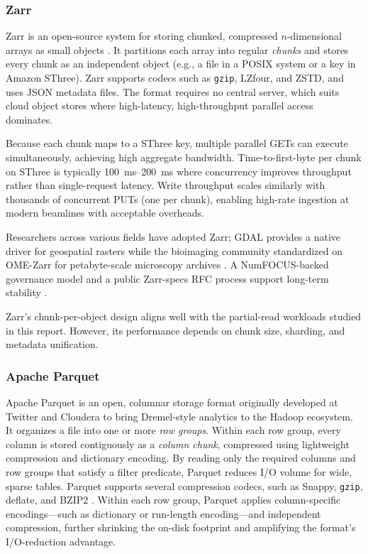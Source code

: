 \documentclass[nomenclature, english, bibtex]{kththesis}
\numberwithin{listing}{chapter}
\begin{document}
\subsubsection{Zarr}
\label{sec:zarr}
Zarr is an open-source system for storing chunked, compressed $n$-dimensional arrays as small objects \cite{zarrspecv3}. It partitions each array into regular \emph{chunks} and stores every chunk as an independent object (e.g., a file in a \gls{POSIX} system or a key in Amazon \gls{SThree}). Zarr supports codecs such as \texttt{gzip}, \gls{LZfour}, and \gls{ZSTD}, and uses \gls{JSON} metadata files. The format requires no central server, which suits cloud object stores where high-latency, high-throughput parallel access dominates.

Because each chunk maps to a \gls{SThree} key, multiple parallel GETs can execute simultaneously, achieving high aggregate bandwidth. Time-to-first-byte per chunk on \gls{SThree} is typically \SIrange{100}{200}{\milli\second} where concurrency improves throughput rather than single-request latency. Write throughput scales similarly with thousands of concurrent PUTs (one per chunk), enabling high-rate ingestion at modern beamlines with acceptable overheads.

Researchers across various fields have adopted Zarr; \gls{GDAL} provides a native driver for geospatial rasters \cite{gdal2024zarr} while the bioimaging community standardized on \gls{OME}-Zarr for petabyte-scale microscopy archives \cite{moore2023ome}. A NumFOCUS-backed governance model and a public Zarr-specs \gls{RFC} process support long-term stability \cite{zarrspecv3}.

Zarr’s chunk-per-object design aligns well with the partial-read workloads studied in this report. However, its performance depends on chunk size, sharding, and metadata unification.

\subsubsection{Apache Parquet}
\label{sec:apache-parquet}
Apache Parquet is an open, columnar storage format originally developed at Twitter and Cloudera to bring Dremel-style analytics to the Hadoop ecosystem. It organizes a file into one or more \emph{row groups}. Within each row group, every column is stored contiguously as a \emph{column chunk}, compressed using lightweight compression and dictionary encoding. By reading only the required columns and row groups that satisfy a filter predicate, Parquet reduces I/O volume for wide, sparse tables. Parquet supports several compression codecs, such as Snappy, \texttt{gzip}, deflate, and BZIP2 \cite{vohra2016apache}. Within each row group, Parquet applies column-specific encodings—such as dictionary or run-length encoding—and independent compression, further shrinking the on-disk footprint and amplifying the format’s I/O-reduction advantage.
\end{document}
